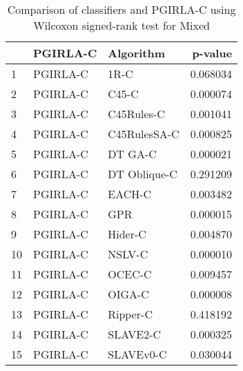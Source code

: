 \begin{table}
\footnotesize
\caption{Comparison of classifiers and PGIRLA-C using Wilcoxon signed-rank test for Mixed}
\label{tab:PGIRLA-C wilcoxon Mixed comparison}
\begin{tabular}{lllr}
\hline
 & PGIRLA-C & Algorithm & p-value \\
\hline
1 & PGIRLA-C & 1R-C & 0.068034 \\
2 & PGIRLA-C & C45-C & 0.000074 \\
3 & PGIRLA-C & C45Rules-C & 0.001041 \\
4 & PGIRLA-C & C45RulesSA-C & 0.000825 \\
5 & PGIRLA-C & DT GA-C & 0.000021 \\
6 & PGIRLA-C & DT Oblique-C & 0.291209 \\
7 & PGIRLA-C & EACH-C & 0.003482 \\
8 & PGIRLA-C & GPR & 0.000015 \\
9 & PGIRLA-C & Hider-C & 0.004870 \\
10 & PGIRLA-C & NSLV-C & 0.000010 \\
11 & PGIRLA-C & OCEC-C & 0.009457 \\
12 & PGIRLA-C & OIGA-C & 0.000008 \\
13 & PGIRLA-C & Ripper-C & 0.418192 \\
14 & PGIRLA-C & SLAVE2-C & 0.000325 \\
15 & PGIRLA-C & SLAVEv0-C & 0.030044 \\
\hline
\end{tabular}
\end{table}

